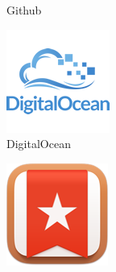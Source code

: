 \begin{figure}[H]
\begin{subfigure}[t]{0.15\linewidth}
        \caption{Github}\label{fig:Github}
    \end{subfigure}
    \quad
    \begin{subfigure}[t]{0.15\linewidth}
        \centering
        \includegraphics[width=\linewidth]{Images/Generic/Icons/DigitalOcean}
        \caption{DigitalOcean}\label{fig:DigitalOcean}
    \end{subfigure}
    \quad
    \begin{subfigure}[t]{0.15\linewidth}
        \centering
        \includegraphics[width=\linewidth]{Images/Generic/Icons/Wunderlist}

\end{subfigure}
\end{figure}
